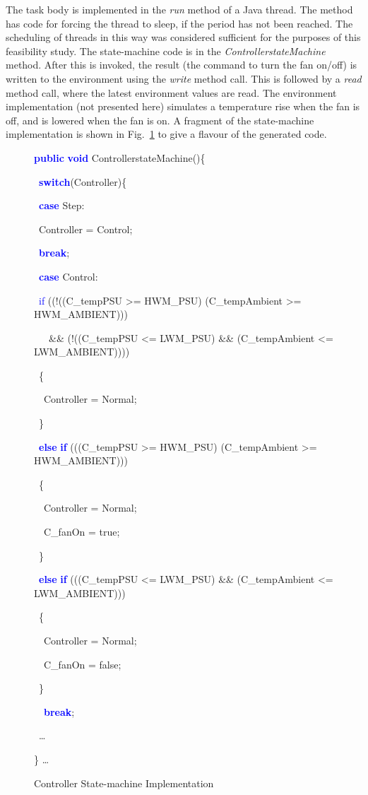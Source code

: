 \documentclass{llncs}%
\begin{document}
The task body is implemented in the \emph{run} method of a Java thread. The method has code for forcing the thread to sleep, if the period has not been reached. The scheduling of threads in this way was considered sufficient for the purposes of this feasibility study. The state-machine code is in the \emph{ControllerstateMachine} method. After this is invoked, the result (the command to turn the fan on/off) is written to the environment using the \emph{write} method call. This is followed by a \emph{read} method call, where the latest environment values are read.  The environment implementation (not presented here) simulates a temperature rise when the fan is off, and is lowered when the fan is on. A fragment of the state-machine implementation is shown in Fig.~\ref{fig:StateM} to give a flavour of the generated code.
%
\begin{figure}[t]
{\ttfamily
\textbf{\textcolor{blue}{public}} \textbf{\textcolor{blue}{void}}
ControllerstateMachine()\{}

{\ttfamily
\ \textbf{\textcolor{blue}{switch}}(Controller)\{}

{\ttfamily
\ \textbf{\textcolor{blue}{case}} Step:}

{\ttfamily
\ Controller = Control;}

{\ttfamily
\ \textbf{\textcolor{blue}{break}};}

{\ttfamily
\ \textbf{\textcolor{blue}{case}} Control:}

{\ttfamily
\ \textcolor{blue}{if} ((!((C\_tempPSU {\textgreater}=
HWM\_PSU) {\textbar}{\textbar} (C\_tempAmbient {\textgreater}= HWM\_AMBIENT))) }

{\ttfamily
\ \ \ \&\& (!((C\_tempPSU {\textless}= LWM\_PSU) \&\&
(C\_tempAmbient {\textless}= LWM\_AMBIENT))))}

{\ttfamily
\ \{}

{\ttfamily
\ \ Controller = Normal;}

{\ttfamily
\ \}}

{\ttfamily
\ \textbf{\textcolor{blue}{else}}
\textbf{\textcolor{blue}{if}} (((C\_tempPSU {\textgreater}= HWM\_PSU)
{\textbar}{\textbar} (C\_tempAmbient {\textgreater}= HWM\_AMBIENT)))}

{\ttfamily
\ \{}

{\ttfamily
\ \ Controller = Normal;}

{\ttfamily
\ \ C\_fanOn = true;}

{\ttfamily
\ \}}

{\ttfamily
\ \textbf{\textcolor{blue}{else}}
\textbf{\textcolor{blue}{if}} (((C\_tempPSU {\textless}= LWM\_PSU) \&\&
(C\_tempAmbient {\textless}= LWM\_AMBIENT)))}

{\ttfamily
\ \{}

{\ttfamily
\ \ Controller = Normal;}

{\ttfamily
\ \ C\_fanOn = false;}

{\ttfamily
\ \}}

{\ttfamily
\ \ \textbf{\textcolor{blue}{break}};}

{\ttfamily
\ {\dots} }

{\ttfamily
\}} \ldots
\caption{Controller State-machine Implementation}
\label{fig:StateM}
\end{figure}
%
%
\end{document}
